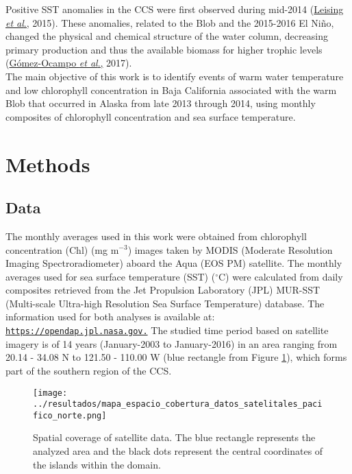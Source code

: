 \documentclass{article} %
\begin{document}
Positive SST anomalies in the CCS were first observed during mid-2014 (\hyperlink{leising}{Leising \textit{et al}.,} 2015). These anomalies, related to the Blob and the 2015-2016 El Niño, changed the physical and chemical structure of the water column, decreasing primary production and thus the available biomass for higher trophic levels (\hyperlink{gomez}{Gómez-Ocampo \textit{et al}.,} 2017).\\

The main objective of this work is to identify events of warm water temperature and low chlorophyll concentration in Baja California associated with the warm Blob that occurred in Alaska from late 2013 through 2014, using monthly composites of chlorophyll concentration and sea surface temperature.\\

\section{Methods}
\subsection{Data}

The monthly averages used in this work were obtained from chlorophyll concentration (Chl) (mg m$^{-3}$) images taken by MODIS (Moderate Resolution Imaging Spectroradiometer) aboard the Aqua (EOS PM) satellite. The monthly averages used for sea surface temperature (SST) ($^{\circ}$C) were calculated from daily composites retrieved from the Jet Propulsion Laboratory (JPL) MUR-SST (Multi-scale Ultra-high Resolution Sea Surface Temperature) database. The information used for both analyses is available at: \href{https://opendap.jpl.nasa.gov.}{\texttt{https://opendap.jpl.nasa.gov.}} The studied time period based on satellite imagery is of 14 years (January-2003 to January-2016) in an area ranging from 20.14 - 34.08 N to 121.50 - 110.00 W (blue rectangle from Figure \ref{fig:satellite}), which forms part of the southern region of the CCS.



\begin{figure}
  \begin{center}
  \texttt{[image: ../resultados/mapa\_espacio\_cobertura\_datos\_satelitales\_pacifico\_norte.png]}
  \caption{Spatial coverage of satellite data. The blue rectangle represents the analyzed area and the black dots represent the central coordinates of the islands within the domain.}
  \label{fig:satellite}
  \end{center}
\end{figure}
\end{document}
